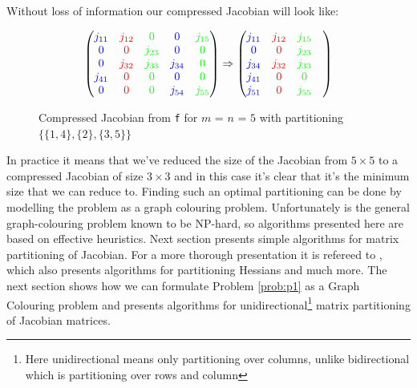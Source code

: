 	Without loss of information our compressed Jacobian will look like:
	\begin{figure}[H]
		$$ \left(\begin{matrix}
		{\color{blue} j_{11}} & {\color{red} j_{12}} & {\color{green} 0 }        &
		{\color{blue} 0 }       & {\color{green} j_{15}} \\
		{\color{blue} 0}        & {\color{red} 0 }       & {\color{green} j_{23}}  &
		{\color{blue} 0 }      & {\color{green} 0} \\
		{\color{blue} 0}        & {\color{red}j_{32}} &  {\color{green} j_{33}}  &
		{\color{blue} j_{34}} & {\color{green} 0 } \\
		{\color{blue} j_{41}} & {\color{red} 0 }       & {\color{green} 0 }         &
		{\color{blue} 0 }        & {\color{green} 0} \\
		{\color{blue} 0 }       & {\color{red} 0 }       & {\color{green} 0 }         &
		{\color{blue} j_{54}} & {\color{green} j_{55} }
		\end{matrix}\right) \Rightarrow \left(\begin{matrix}
		{\color{blue} j_{11}} & {\color{red} j_{12}} & {\color{green} j_{15}} \\
		{\color{blue} 0} & {\color{red} 0} & {\color{green} j_{23}} \\
		{\color{blue} j_{34}} & {\color{red} j_{32}} & {\color{green} j_{33}}  \\
		{\color{blue} j_{41}} & {\color{red} 0} & {\color{green} 0}  \\
		{\color{blue} j_{51}} & {\color{red} 0} & {\color{green} j_{55}} &
		\end{matrix}\right) $$
		\caption{Compressed Jacobian from \texttt{f} for $m$ = $n$ = $5$ with
			partitioning $\{\{1,4\}, \{2\}, \{3,5\}\}$}
		\label{fig:Jacob_partition}
	\end{figure}
	In practice it means that we've reduced the size of the Jacobian from $5 \times
	5$ to a compressed Jacobian of size $3 \times 3$ and in this case it's clear
	that it's the minimum size that we can reduce to. Finding such an optimal
	partitioning can be done
	by modelling the problem as a graph colouring problem.  Unfortunately is
	the general graph-colouring problem known to be NP-hard, so algorithms presented
	here are based on effective heuristics. Next section presents simple algorithms
	for matrix partitioning of Jacobian. For a more thorough presentation it is
	refereed to \cite{Jacobian}, which also presents algorithms for
	partitioning Hessians and much more. The next section shows how we can formulate
	Problem \ref{prob:p1} as a
	Graph Colouring problem and presents algorithms for unidirectional\footnote{Here
		unidirectional means only partitioning over columns, unlike bidirectional which
		is partitioning over rows and column} matrix partitioning of Jacobian matrices.


